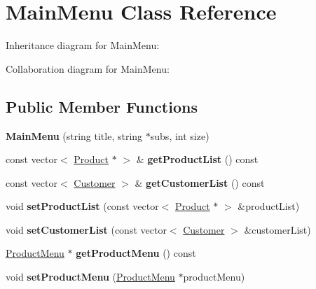 \hypertarget{classMainMenu}{}\section{Main\+Menu Class Reference}
\label{classMainMenu}


Inheritance diagram for Main\+Menu\+:


Collaboration diagram for Main\+Menu\+:
\subsection*{Public Member Functions}
\begin{DoxyCompactItemize}
\item 
{\bfseries Main\+Menu} (string title, string $\ast$subs, int size)\hypertarget{classMainMenu_a93e1d259111c62db67d9150fac4e8396}{}\label{classMainMenu_a93e1d259111c62db67d9150fac4e8396}

\item 
const vector$<$ \hyperlink{classProduct}{Product} $\ast$ $>$ \& {\bfseries get\+Product\+List} () const \hypertarget{classMainMenu_af797940403e4861707ec38b49c3bb877}{}\label{classMainMenu_af797940403e4861707ec38b49c3bb877}

\item 
const vector$<$ \hyperlink{classCustomer}{Customer} $>$ \& {\bfseries get\+Customer\+List} () const \hypertarget{classMainMenu_a767a7b46b797999747042dbac8a7fa1b}{}\label{classMainMenu_a767a7b46b797999747042dbac8a7fa1b}

\item 
void {\bfseries set\+Product\+List} (const vector$<$ \hyperlink{classProduct}{Product} $\ast$ $>$ \&product\+List)\hypertarget{classMainMenu_a7e92c219fdadcfcf8d34d25d14ed90e0}{}\label{classMainMenu_a7e92c219fdadcfcf8d34d25d14ed90e0}

\item 
void {\bfseries set\+Customer\+List} (const vector$<$ \hyperlink{classCustomer}{Customer} $>$ \&customer\+List)\hypertarget{classMainMenu_aa78eaffbe8203475575aac6f330497c9}{}\label{classMainMenu_aa78eaffbe8203475575aac6f330497c9}

\item 
\hyperlink{classProductMenu}{Product\+Menu} $\ast$ {\bfseries get\+Product\+Menu} () const \hypertarget{classMainMenu_a6803aa733e52be3d4987aea068da1f61}{}\label{classMainMenu_a6803aa733e52be3d4987aea068da1f61}

\item 
void {\bfseries set\+Product\+Menu} (\hyperlink{classProductMenu}{Product\+Menu} $\ast$product\+Menu)\hypertarget{classMainMenu_aaca12cbc08bfe9533544375cd8da5a8e}{}\label{classMainMenu_aaca12cbc08bfe9533544375cd8da5a8e}


\end{DoxyCompactItemize}
